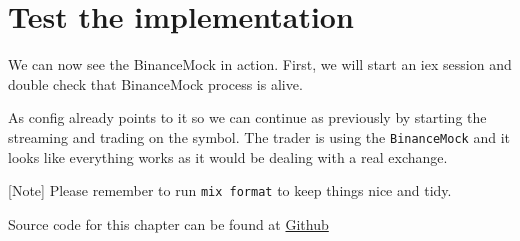 \documentclass[
  oneside]{book}
\newenvironment{Shaded}{\begin{snugshade}}{\end{snugshade}}
\newcommand{\AttributeTok}[1]{\textcolor[rgb]{0.77,0.63,0.00}{#1}}
\newcommand{\CommentTok}[1]{\textcolor[rgb]{0.56,0.35,0.01}{\textit{#1}}}
\newcommand{\ErrorTok}[1]{\textcolor[rgb]{0.64,0.00,0.00}{\textbf{#1}}}
\newcommand{\ExtensionTok}[1]{#1}
\newcommand{\KeywordTok}[1]{\textcolor[rgb]{0.13,0.29,0.53}{\textbf{#1}}}
\newcommand{\NormalTok}[1]{#1}
\newcommand{\OperatorTok}[1]{\textcolor[rgb]{0.81,0.36,0.00}{\textbf{#1}}}
\newcommand{\StringTok}[1]{\textcolor[rgb]{0.31,0.60,0.02}{#1}}
\begin{document}
\hypertarget{test-the-implementation}{%
\section{Test the implementation}\label{test-the-implementation}}

We can now see the BinanceMock in action. First, we will start an iex session and double check that BinanceMock process is alive.

\begin{Shaded}
\end{Shaded}

As config already points to it so we can continue as previously by starting the streaming and trading on the symbol. The trader is using the \texttt{BinanceMock} and it looks like everything works as it would be dealing with a real exchange.

{[}Note{]} Please remember to run \texttt{mix\ format} to keep things nice and tidy.

Source code for this chapter can be found at \href{https://github.com/frathon/create-a-cryptocurrency-trading-bot-in-elixir-source-code/tree/chapter_04}{Github}
\end{document}
